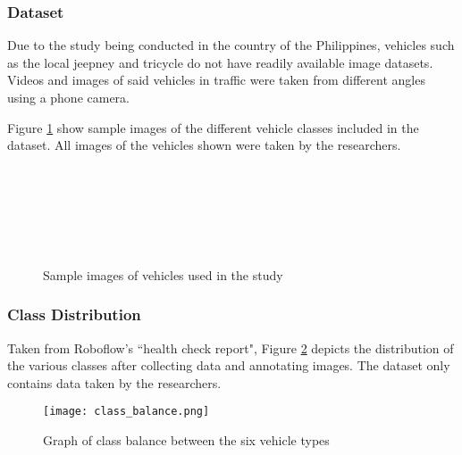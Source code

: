 \subsubsection{Dataset}

Due to the study being conducted in the country of the Philippines, vehicles such as the local jeepney and tricycle do not have readily available image datasets. Videos and images of said vehicles in traffic were taken from different angles using a phone camera. 

Figure \ref{fig:vehicle_samples} show sample images of the different vehicle classes included in the dataset. All images of the vehicles shown were taken by the researchers.

\begin{figure}[!htbp]
	\begin{minipage}{1\textwidth}
		\centering
		
		\\
		
		\\
		
		\\
		
		\\
		
		\\
		
	\end{minipage}
	\caption{Sample images of vehicles used in the study}
	\label{fig:vehicle_samples}
\end{figure}
\FloatBarrier

\subsubsection{Class Distribution}
Taken from Roboflow's ``health check report", Figure \ref{fig:class_bal} depicts the distribution of the various classes after collecting data and annotating images. The dataset only contains data taken by the researchers.

\begin{figure}[!htbp]
	\texttt{[image: class\_balance.png]}
	\caption{Graph of class balance between the six vehicle types}
	\label{fig:class_bal}
\end{figure}
\FloatBarrier

